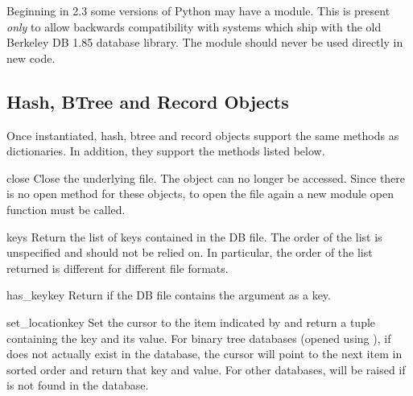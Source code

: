 \begin{notice}
Beginning in 2.3 some \UNIX{} versions of Python may have a 
module.  This is present \emph{only} to allow backwards compatibility with
systems which ship with the old Berkeley DB 1.85 database library.  The
 module should never be used directly in new code.
\end{notice}


\begin{seealso}
\end{seealso}

\subsection{Hash, BTree and Record Objects \label{bsddb-objects}}

Once instantiated, hash, btree and record objects support
the same methods as dictionaries.  In addition, they support
the methods listed below.

\begin{methoddesc}{close}{}
Close the underlying file.  The object can no longer be accessed.  Since
there is no open  method for these objects, to open the file
again a new  module open function must be called.
\end{methoddesc}

\begin{methoddesc}{keys}{}
Return the list of keys contained in the DB file.  The order of the list is
unspecified and should not be relied on.  In particular, the order of the
list returned is different for different file formats.
\end{methoddesc}

\begin{methoddesc}{has_key}{key}
Return  if the DB file contains the argument as a key.
\end{methoddesc}

\begin{methoddesc}{set_location}{key}
Set the cursor to the item indicated by  and return a tuple
containing the key and its value.  For binary tree databases (opened
using ), if  does not actually exist in
the database, the cursor will point to the next item in sorted order
and return that key and value.  For other databases,
 will be raised if  is not found in the
database.
\end{methoddesc}


